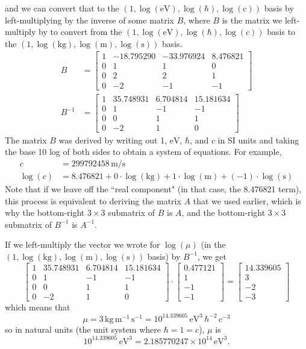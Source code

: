 \documentclass[12pt]{article}
\begin{document}
and we can convert that to the $(1, \log(\mathrm{eV}), \log(\mathrm{\hbar}), \log(\mathrm{c}))$ basis by left-multiplying by the inverse of some matrix $B$, where $B$ is the matrix we left-multiply by to convert from the $(1, \log(\mathrm{eV}), \log(\hbar), \log(c))$ basis to the $(1, \log(\mathrm{kg}), \log(\mathrm{m}), \log(\mathrm{s}))$ basis.
\begin{align*}
    B &= \begin{bmatrix}
    1 & -18.795290 & -33.976924 & 8.476821 \\
    0 & 1 & 1 & 0 \\
    0 & 2 & 2 & 1 \\
    0 & -2 & -1 & -1
\end{bmatrix} \\
    B^{-1} &= \begin{bmatrix}
        1 & 35.748931 & 6.704814 & 15.181634 \\
        0 & 1 & -1 & -1 \\
        0 & 0 & 1 & 1 \\
        0 & -2 & 1 & 0
    \end{bmatrix}
\end{align*}
The matrix $B$ was derived by writing out 1, $\mathrm{eV}$, $\hbar$, and $c$ in SI units and taking the base 10 log of both sides to obtain a system of equations. For example,
\begin{align*}
    c &= 299792458 \, \mathrm{m} / \mathrm{s} \\
    \log(c) &= 8.476821 + 0 \cdot \log(\mathrm{kg}) + 1 \cdot \log(\mathrm{m}) + (-1) \cdot \log(\mathrm{s})
\end{align*}
Note that if we leave off the ``real component" (in that case, the 8.476821 term), this process is equivalent to deriving the matrix $A$ that we used earlier, which is why the bottom-right $3 \times 3$ submatrix of $B$ is $A$, and the bottom-right $3 \times 3$ submatrix of $B^{-1}$ is $A^{-1}$.
\par
If we left-multiply the vector we wrote for $\log(\mu)$ (in the $(1, \log(\mathrm{kg}), \log(\mathrm{m}), \log(\mathrm{s}))$ basis) by $B^{-1}$, we get
\[ \begin{bmatrix}
        1 & 35.748931 & 6.704814 & 15.181634 \\
        0 & 1 & -1 & -1 \\
        0 & 0 & 1 & 1 \\
        0 & -2 & 1 & 0
    \end{bmatrix} \cdot \begin{bmatrix}
    0.477121 \\
    1 \\
    -1 \\
    -1
\end{bmatrix} = \begin{bmatrix}
    14.339605 \\
    3 \\
    -2 \\
    -3
\end{bmatrix} \]
which means that
\[ \mu = 3 \, \mathrm{kg} \, \mathrm{m}^{-1} \, \mathrm{s}^{-1} = 10^{14.339605} \, \mathrm{eV}^3 \, \hbar^{-2} \, c^{-3} \]
so in natural units (the unit system where $\hbar=1=c$), $\mu$ is
\[ 10^{14.339605} \, \mathrm{eV}^3 = 2.185770247 \times 10^{14} \, \mathrm{eV}^3. \]
\end{document}
